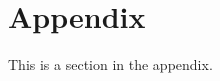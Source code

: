 \documentclass[11pt]{article}
\begin{document}
% 



\appendix

\section{Appendix}
\label{sec:appendix}
This is a section in the appendix.
\end{document}
